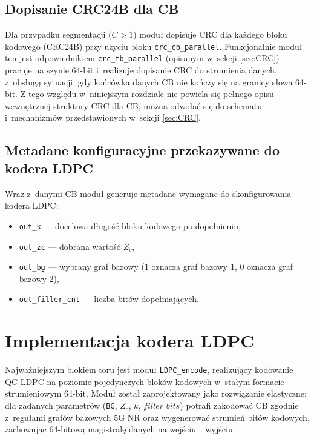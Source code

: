 \subsection{Dopisanie CRC24B dla CB}
\label{subsec:ldpc_prep_crc_cb}

Dla przypadku segmentacji ($C>1$) moduł dopisuje CRC dla każdego bloku kodowego (CRC24B) przy użyciu bloku \texttt{crc\_cb\_parallel}. Funkcjonalnie moduł ten jest odpowiednikiem \texttt{crc\_tb\_parallel} (opisanym w~sekcji \ref{sec:CRC}) --- pracuje na szynie 64-bit i~realizuje dopisanie CRC do strumienia danych, z~obsługą sytuacji, gdy końcówka danych CB nie kończy się na granicy słowa 64-bit. Z tego względu w~niniejszym rozdziale nie powiela się pełnego opisu wewnętrznej struktury CRC dla CB; można odwołać się do schematu i~mechanizmów przedstawionych w~sekcji \ref{sec:CRC}.

\subsection{Metadane konfiguracyjne przekazywane do kodera LDPC}
\label{subsec:ldpc_prep_metadata}

Wraz z~danymi CB moduł generuje metadane wymagane do skonfigurowania kodera LDPC:
\begin{itemize}
  \item \texttt{out\_k} --- docelowa długość bloku kodowego po dopełnieniu,
  \item \texttt{out\_zc} --- dobrana wartość $Z_c$,
  \item \texttt{out\_bg} --- wybrany graf bazowy (1 oznacza graf bazowy 1, 0 oznacza graf bazowy 2),
  \item \texttt{out\_filler\_cnt} --- liczba bitów dopełniających.
\end{itemize}

\section{Implementacja kodera LDPC}
\label{sec:ldpc_encoder_impl}

Najważniejszym blokiem toru jest moduł \texttt{LDPC\_encode}, realizujący kodowanie QC-LDPC na poziomie pojedynczych bloków kodowych w~stałym formacie strumieniowym 64-bit. Moduł został zaprojektowany jako rozwiązanie elastyczne: dla zadanych parametrów (\texttt{BG}, $Z_c$, $k$, $filler$ $bits$) potrafi zakodować CB zgodnie z~regułami grafów bazowych 5G NR oraz wygenerować strumień bitów kodowych, zachowując 64-bitową magistralę danych na wejściu i~wyjściu.

